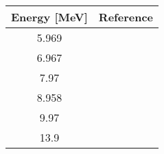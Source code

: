\begin{tabular}{c c} 
    \toprule 
    \bf{Energy [MeV]} & \bf{Reference} \\
    \midrule
    5.969 & \cite{Roberts91}\\
    6.967 & \cite{Roberts91}\\
    7.97 & \cite{Roberts91}\\
    8.958 & \cite{Roberts91}\\
    9.97 & \cite{Delaroche83}\\
    13.9 & \cite{FloydPhDThesis}\\
    \bottomrule
\end{tabular}
